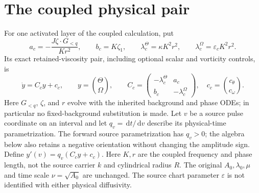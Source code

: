 \documentclass[11pt]{article}
\newcommand{\dd}{\,\mathrm d}
\begin{document}
\section{The coupled physical pair}
For one activated layer of the coupled calculation, put
\begin{equation}
 a_c=-\frac{J\zeta\cdot G_{<q}}{Kr^2},\qquad b_c=K\zeta_1,\qquad
 \lambda_c^\Theta=\kappa K^2r^2,\qquad \lambda_c^\Omega=\varepsilon_c K^2r^2.
\end{equation}
Its exact retained-viscosity pair, including optional scalar and vorticity
controls, is
\begin{equation}
 \dot y=C_cy+c_c,\qquad y=\binom{\Theta}{\Omega},\qquad
 C_c=\begin{pmatrix}-\lambda_c^\Theta&a_c\\b_c&-\lambda_c^\Omega\end{pmatrix},\quad
 c_c=\binom{c_\theta}{c_\omega}.
 \label{eq:coupledpair}
\end{equation}
Here $G_{<q}$, $\zeta$, and $r$ evolve with the inherited background and phase
ODEs; in particular no fixed-background substitution is made.  Let $v$ be a
source pulse coordinate on an interval and let $q_v=\dd t/\dd v$ describe
its physical-time parametrization. The forward source parametrization has
$q_v>0$; the algebra below also retains a negative orientation without
changing the amplitude sign. Define $y'(v)=q_v(C_cy+c_c)$.
Here $K,r$ are the coupled frequency and phase length, not the source
carrier $k$ and cylindrical radius $R$. The original $A_0,\lambda_0,\mu$
and time scale $\nu=\sqrt{A_0}$ are unchanged. The source chart parameter
$\varepsilon$ is not identified with either physical diffusivity.
\end{document}
